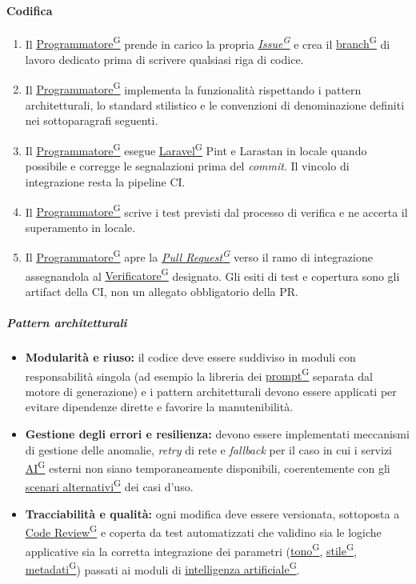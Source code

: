 \documentclass[a4paper,12pt]{article}
\providecommand{\glslink}[2]{\href{https://alittlebyte-19.github.io/Documentazione/glossario.html\#gls-#1}{\underline{#2}\textsuperscript{\scriptsize G}}}
\begin{document}
\paragraph{Codifica}
\begin{enumerate}
    \item Il \glslink{programmatore}{Programmatore} prende in carico la propria \textit{\glslink{issue}{Issue}} e crea il \glslink{branch}{branch} di lavoro dedicato prima di scrivere qualsiasi riga di codice.
    \item Il \glslink{programmatore}{Programmatore} implementa la funzionalità rispettando i pattern architetturali, lo standard stilistico e le convenzioni di denominazione definiti nei sottoparagrafi seguenti.
    \item Il \glslink{programmatore}{Programmatore} esegue \glslink{laravel}{Laravel} Pint e Larastan in locale quando possibile e corregge le segnalazioni prima del \textit{commit}. Il vincolo di integrazione resta la pipeline CI.
    \item Il \glslink{programmatore}{Programmatore} scrive i test previsti dal processo di verifica e ne accerta il superamento in locale.
    \item Il \glslink{programmatore}{Programmatore} apre la \textit{\glslink{pull-request}{Pull Request}} verso il ramo di integrazione assegnandola al \glslink{verificatore}{Verificatore} designato. Gli esiti di test e copertura sono gli artifact della CI, non un allegato obbligatorio della PR.
\end{enumerate}

\subparagraph{Pattern architetturali}
\begin{itemize}
    \item \textbf{Modularità e riuso:} il codice deve essere suddiviso in moduli con responsabilità singola (ad esempio la libreria dei \glslink{prompt}{prompt} separata dal motore di generazione) e i pattern architetturali devono essere applicati per evitare dipendenze dirette e favorire la manutenibilità.
    \item \textbf{Gestione degli errori e resilienza:} devono essere implementati meccanismi di gestione delle anomalie, \textit{retry} di rete e \textit{fallback} per il caso in cui i servizi \glslink{intelligenza-artificiale-ai}{AI} esterni non siano temporaneamente disponibili, coerentemente con gli \glslink{scenario-alternativo}{scenari alternativi} dei casi d'uso.
    \item \textbf{Tracciabilità e qualità:} ogni modifica deve essere versionata, sottoposta a \glslink{code-review}{Code Review} e coperta da test automatizzati che validino sia le logiche applicative sia la corretta integrazione dei parametri (\glslink{tono-comunicativo}{tono}, \glslink{stile-editoriale}{stile}, \glslink{metadati}{metadati}) passati ai moduli di \glslink{intelligenza-artificiale-ai}{intelligenza artificiale}.
\end{itemize}
\end{document}
